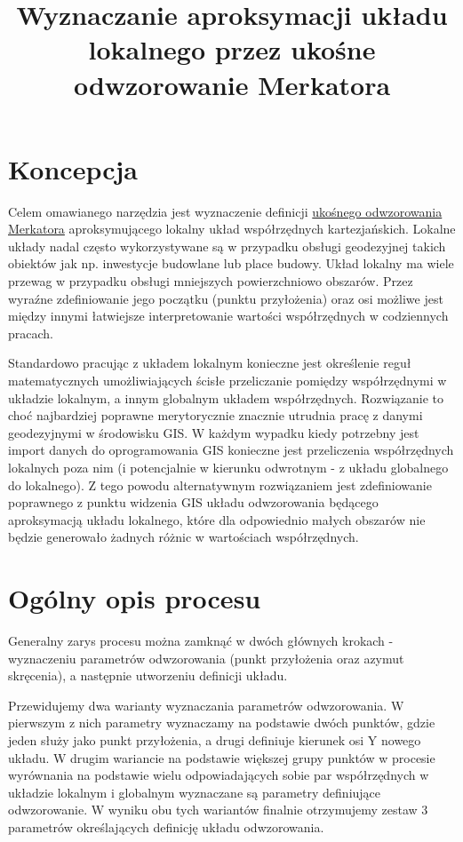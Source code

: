 \documentclass{article}
\title{Wyznaczanie aproksymacji układu lokalnego przez ukośne odwzorowanie Merkatora}
\begin{document}
\maketitle

\section{Koncepcja}
Celem omawianego narzędzia jest wyznaczenie definicji \href{https://proj.org/en/stable/operations/projections/omerc.html}{ukośnego odwzorowania Merkatora} 
aproksymującego lokalny układ współrzędnych kartezjańskich. Lokalne układy nadal często wykorzystywane są w przypadku obsługi geodezyjnej takich obiektów 
jak np. inwestycje budowlane lub place budowy. Układ lokalny ma wiele przewag w przypadku obsługi mniejszych powierzchniowo obszarów. Przez wyraźne zdefiniowanie 
jego początku (punktu przyłożenia) oraz osi możliwe jest między innymi łatwiejsze interpretowanie wartości współrzędnych w codziennych pracach.

Standardowo pracując z układem lokalnym konieczne jest określenie reguł matematycznych umożliwiających ścisłe przeliczanie pomiędzy współrzędnymi w układzie lokalnym, 
a innym globalnym układem współrzędnych. Rozwiązanie to choć najbardziej poprawne merytorycznie znacznie utrudnia pracę z danymi geodezyjnymi w środowisku GIS. 
W każdym wypadku kiedy potrzebny jest import danych do oprogramowania GIS konieczne jest przeliczenia współrzędnych lokalnych poza nim (i potencjalnie w kierunku odwrotnym 
- z układu globalnego do lokalnego). Z tego powodu alternatywnym rozwiązaniem jest zdefiniowanie poprawnego z punktu widzenia GIS układu odwzorowania będącego aproksymacją 
układu lokalnego, które dla odpowiednio małych obszarów nie będzie generowało żadnych różnic w wartościach współrzędnych.

\section{Ogólny opis procesu}
Generalny zarys procesu można zamknąć w dwóch głównych krokach - wyznaczeniu parametrów odwzorowania (punkt przyłożenia oraz azymut skręcenia), a następnie utworzeniu definicji układu.

Przewidujemy dwa warianty wyznaczania parametrów odwzorowania. W pierwszym z nich parametry wyznaczamy na podstawie dwóch punktów, gdzie jeden służy jako punkt przyłożenia, 
a drugi definiuje kierunek osi Y nowego układu. W drugim wariancie na podstawie większej grupy punktów w procesie wyrównania na podstawie wielu odpowiadających sobie par współrzędnych 
w układzie lokalnym i globalnym wyznaczane są parametry definiujące odwzorowanie. W wyniku obu tych wariantów finalnie otrzymujemy zestaw 3 parametrów określających definicję układu odwzorowania.
\end{document}
